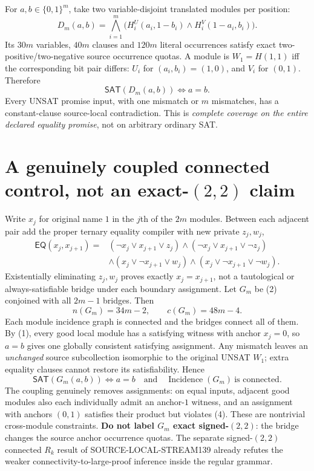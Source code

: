 \documentclass[11pt]{article}
\newcommand{\SAT}{\mathsf{SAT}}
\begin{document}
For $a,b\in\{0,1\}^m$, take two variable-disjoint translated modules per position:
\[
D_m(a,b)=\bigwedge_{i=1}^{m}\bigl(H_i^U(a_i,1-b_i)\land H_i^V(1-a_i,b_i)\bigr).
\tag{2}
\]
Its $30m$ variables, $40m$ clauses and $120m$ literal occurrences satisfy exact two-positive/two-negative source occurrence quotas. A module is $W_1=H(1,1)$ iff the corresponding bit pair differs: $U_i$ for $(a_i,b_i)=(1,0)$, and $V_i$ for $(0,1)$. Therefore
\[
\boxed{\SAT(D_m(a,b))\iff a=b.} \tag{3}
\]
Every UNSAT promise input, with one mismatch or $m$ mismatches, has a constant-clause source-local contradiction. This is \emph{complete coverage on the entire declared equality promise}, not on arbitrary ordinary SAT.

\section{A genuinely coupled connected control, not an exact-$(2,2)$ claim}
Write $x_j$ for original name $1$ in the $j$th of the $2m$ modules. Between each adjacent pair add the proper ternary equality compiler with new private $z_j,w_j$,
\[
\begin{split}
\mathsf{EQ}(x_j,x_{j+1})={}&
(\neg x_j\vee x_{j+1}\vee z_j)
\land(\neg x_j\vee x_{j+1}\vee\neg z_j)\\
&\land(x_j\vee\neg x_{j+1}\vee w_j)
\land(x_j\vee\neg x_{j+1}\vee\neg w_j).
\end{split}\tag{4}
\]
Existentially eliminating $z_j,w_j$ proves exactly $x_j=x_{j+1}$, not a tautological or always-satisfiable bridge under each boundary assignment. Let $G_m$ be (2) conjoined with all $2m-1$ bridges. Then
\[
n(G_m)=34m-2,\qquad c(G_m)=48m-4.\tag{5}
\]
Each module incidence graph is connected and the bridges connect all of them. By (1), every good local module has a satisfying witness with anchor $x_j=0$, so $a=b$ gives one globally consistent satisfying assignment. Any mismatch leaves an \emph{unchanged} source subcollection isomorphic to the original UNSAT $W_1$; extra equality clauses cannot restore its satisfiability. Hence
\[
\boxed{\SAT(G_m(a,b))\iff a=b}\quad\text{and}\quad
\operatorname{Incidence}(G_m)\ \text{is connected}.\tag{6}
\]
The coupling genuinely removes assignments: on equal inputs, adjacent good modules also each individually admit an anchor-$1$ witness, and an assignment with anchors $(0,1)$ satisfies their product but violates (4). These are nontrivial cross-module constraints. \textbf{Do not label $G_m$ exact signed-$(2,2)$}: the bridge changes the source anchor occurrence quotas. The separate signed-$(2,2)$ connected $R_k$ result of SOURCE-LOCAL-STREAM139 already refutes the weaker connectivity-to-large-proof inference inside the regular grammar.
\end{document}
